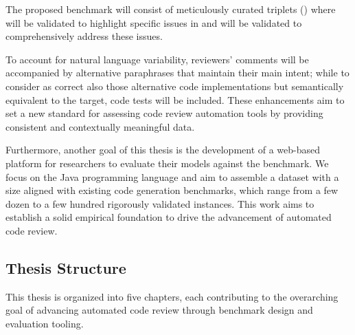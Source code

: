 The proposed benchmark will consist of meticulously curated triplets (\subCode)
where \revComment will be validated to highlight specific issues in \subCode and
\revCode will be validated to comprehensively address these issues.

To account for natural language variability, reviewers' comments will be accompanied by
alternative paraphrases that maintain their main intent; while to consider as correct also
those alternative code implementations but semantically equivalent to the target, code tests will
be included. These enhancements aim to set a new standard for assessing code review
automation tools by providing consistent and contextually meaningful data.

Furthermore, another goal of this thesis is the development of a web-based platform for researchers
to evaluate their models against the benchmark. We focus on the Java programming language and aim to
assemble a dataset with a size aligned with existing code generation benchmarks, which range from a
few dozen to a few hundred rigorously validated instances. This work aims to establish a solid
empirical foundation to drive the advancement of automated code review.

\subsection{Thesis Structure}

This thesis is organized into five chapters, each contributing to the overarching goal of advancing
automated code review through benchmark design and evaluation tooling.

